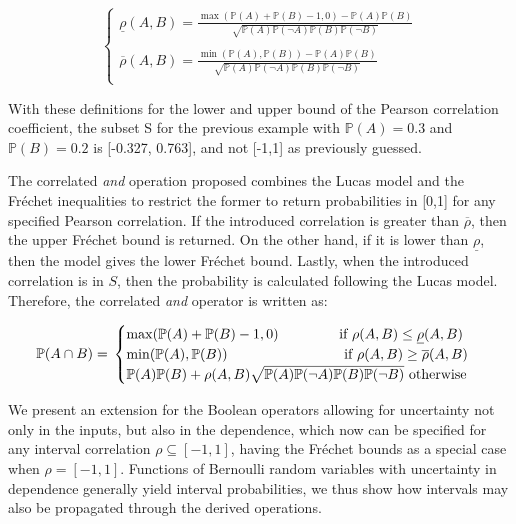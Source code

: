 \documentclass[runningheads]{llncs}
\begin{document}
\begin{equation}
    \begin{cases}
      \underline{\rho}(A,B) = \frac{\max(\mathbb{P}(A)+\mathbb{P}(B)-1,0) - \mathbb{P}(A)\mathbb{P}(B)}{\sqrt{\mathbb{P}(A)\mathbb{P}(\neg A)\mathbb{P}(B)\mathbb{P}(\neg B)}}\\
      \\
      \overline{\rho}(A,B) = \frac{\min(\mathbb{P}(A),\mathbb{P}(B)) - \mathbb{P}(A)\mathbb{P}(B)}{\sqrt{\mathbb{P}(A)\mathbb{P}(\neg A)\mathbb{P}(B)\mathbb{P}(\neg B)}}\\
    \end{cases}       
\end{equation}

\noindent With these definitions for the lower and upper bound of the Pearson correlation coefficient, the subset S for the previous example with $\mathbb{P}(A) = 0.3$ and $\mathbb{P}(B) = 0.2$ is [-0.327, 0.763], and not [-1,1] as previously guessed.

The correlated \textit{and} operation proposed combines the Lucas model and the Fréchet inequalities to restrict the former to return probabilities in [0,1] for any specified Pearson correlation.
If the introduced correlation is greater than $\overline\rho$, then the upper Fréchet bound is returned.
On the other hand, if it is lower than $\underline\rho$, then the model gives the lower Fréchet bound.
Lastly, when the introduced correlation is in $S$, then the probability is calculated following the Lucas model.
Therefore, the correlated \textit{and} operator is written as:

\begin{equation}
\mathbb{P}(A \cap B) = \\
\begin{cases}
  \max(\mathbb{P}(A) + \mathbb{P}(B) -1, 0) \qquad \qquad \text{ if } \rho(A,B) \le \underline{\rho}(A,B) \\
  \min(\mathbb{P}(A),\mathbb{P}(B)) \qquad \qquad\qquad\qquad \text{ if } \rho(A,B) \ge \overline{\rho}(A,B) \\
  \mathbb{P}(A)\mathbb{P}(B) + \rho(A,B)\sqrt{\mathbb{P}(A)\mathbb{P}(\neg A)\mathbb{P}(B)\mathbb{P}(\neg B)} \text{ otherwise}
\end{cases}
\end{equation}

We present an extension for the Boolean operators allowing for uncertainty not only in the inputs, but also in the dependence, which now can be specified for any interval correlation $\rho \subseteq [-1, 1]$, having the Fréchet bounds as a special case when $\rho = [-1,1]$. Functions of Bernoulli random variables with uncertainty in dependence generally yield interval probabilities, we thus show how intervals may also be propagated through the derived operations. 
\end{document}
